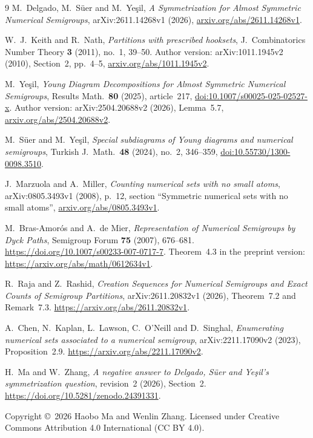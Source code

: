 \documentclass[11pt,a4paper]{article}
\theoremstyle{definition}
\theoremstyle{remark}
\begin{document}
\begin{thebibliography}{9}
\small
{}
M.~Delgado, M.~S\"uer and M.~Ye\c{s}il,
\emph{A Symmetrization for Almost Symmetric Numerical Semigroups},
arXiv:2611.14268v1 (2026),
\href{https://arxiv.org/abs/2611.14268v1}{arxiv.org/abs/2611.14268v1}.

W.~J.~Keith and R.~Nath,
\emph{Partitions with prescribed hooksets},
J.~Combinatorics Number Theory \textbf{3} (2011), no.~1, 39--50.
Author version: arXiv:1011.1945v2 (2010), Section~2, pp.~4--5,
\href{https://arxiv.org/abs/1011.1945v2}{arxiv.org/abs/1011.1945v2}.

M.~Ye\c{s}il,
\emph{Young Diagram Decompositions for Almost Symmetric Numerical Semigroups},
Results Math.~\textbf{80} (2025), article~217,
\href{https://doi.org/10.1007/s00025-025-02527-x}{doi:10.1007/s00025-025-02527-x}.
Author version: arXiv:2504.20688v2 (2026), Lemma~5.7,
\href{https://arxiv.org/abs/2504.20688v2}{arxiv.org/abs/2504.20688v2}.

M.~S\"uer and M.~Ye\c{s}il,
\emph{Special subdiagrams of Young diagrams and numerical semigroups},
Turkish J.~Math.~\textbf{48} (2024), no.~2, 346--359,
\href{https://doi.org/10.55730/1300-0098.3510}{doi:10.55730/1300-0098.3510}.

J.~Marzuola and A.~Miller,
\emph{Counting numerical sets with no small atoms}, arXiv:0805.3493v1 (2008),
p.~12, section ``Symmetric numerical sets with no small atoms'',
\href{https://arxiv.org/abs/0805.3493v1}{arxiv.org/abs/0805.3493v1}.

M.~Bras-Amor\'os and A.~de Mier,
\emph{Representation of Numerical Semigroups by Dyck Paths},
Semigroup Forum \textbf{75} (2007), 676--681.
\url{https://doi.org/10.1007/s00233-007-0717-7}.
Theorem~4.3 in the preprint version:
\url{https://arxiv.org/abs/math/0612634v1}.

R.~Raja and Z.~Rashid,
\emph{Creation Sequences for Numerical Semigroups and Exact Counts of
Semigroup Partitions}, arXiv:2611.20832v1 (2026), Theorem~7.2 and Remark~7.3.
\url{https://arxiv.org/abs/2611.20832v1}.

A.~Chen, N.~Kaplan, L.~Lawson, C.~O'Neill and D.~Singhal,
\emph{Enumerating numerical sets associated to a numerical semigroup},
arXiv:2211.17090v2 (2023), Proposition~2.9.
\url{https://arxiv.org/abs/2211.17090v2}.

H.~Ma and W.~Zhang,
\emph{A negative answer to Delgado, S\"uer and Ye\c{s}il's symmetrization question},
revision~2 (2026), Section~2.
\url{https://doi.org/10.5281/zenodo.24391331}.
\end{thebibliography}

\smallskip
\noindent\small Copyright \copyright\ 2026 Haobo Ma and Wenlin Zhang.
Licensed under Creative Commons Attribution 4.0 International (CC BY 4.0).
\end{document}
